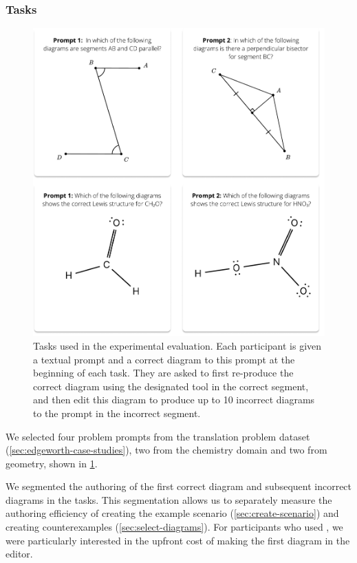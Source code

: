 \subsubsection{Tasks}
\label{sec:edgeworth-user-tasks}

\begin{figure}
    \centering
    \includegraphics[width=\linewidth]{assets/edgeworth-eval/user-study-tasks.pdf}
    \caption{Tasks used in the \Edgeworth experimental evaluation. Each participant is given a textual prompt and a correct diagram to this prompt at the beginning of each task. They are asked to first re-produce the correct diagram using the designated tool in the correct segment, and then edit this diagram to produce up to 10 incorrect diagrams to the prompt in the incorrect segment.}
    \label{fig:edgeworth-user-study-tasks}
\end{figure}

We selected four problem prompts from the translation problem dataset (\cref{sec:edgeworth-case-studies}), two from the chemistry domain and two from geometry, shown in \cref{fig:edgeworth-user-study-tasks}.

We segmented the authoring of the first correct diagram and subsequent incorrect diagrams in the tasks. This segmentation allows us to separately measure the authoring efficiency of creating the example scenario (\cref{sec:create-scenario}) and creating counterexamples (\cref{sec:select-diagrams}). For participants who used \Edgeworth, we were particularly interested in the upfront cost of making the first \Substance diagram in the \Penrose editor. 

